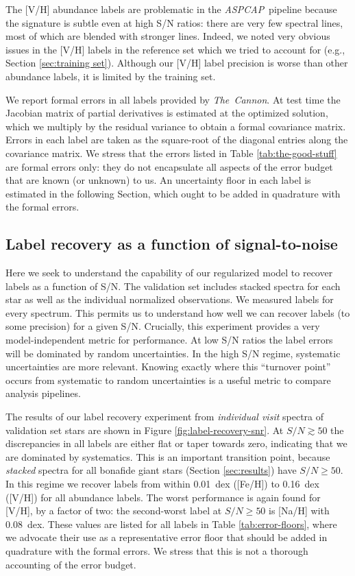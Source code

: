\documentclass[12pt,preprint]{aastex6}
\newcommand{\project}[1]{\textsl{#1}}
\newcommand{\TheCannon}{\project{The~Cannon}}
\newcommand{\acronym}[1]{{\small{#1}}}
\newcommand{\aspcap}{\project{\acronym{ASPCAP}}}
\begin{document}
The [V/H] abundance labels are problematic in the \aspcap\ pipeline 
because the signature is subtle even at high S/N ratios: there are very few
spectral lines, most of which are blended with stronger lines.  Indeed, we noted
very obvious issues in the [V/H] labels in the reference set which we tried to
account for (e.g., Section \ref{sec:training set}).  Although our [V/H]
label precision is worse than other abundance labels, it is limited by the
training set.


We report formal errors in all labels provided by \TheCannon. At test time the
Jacobian matrix of partial derivatives is estimated at the optimized solution,
which we multiply by the residual variance to obtain a formal covariance matrix.
Errors in each label are taken as the square-root of the diagonal entries along
the covariance matrix. We stress that the errors listed in Table \ref{tab:the-good-stuff}
are formal errors only: they do not encapsulate all aspects of the error budget
that are known (or unknown) to us. An uncertainty floor in each label is estimated
in the following Section, which ought to be added in quadrature with the formal
errors.

\subsection{Label recovery as a function of signal-to-noise}
\label{sec:label-recovery-snr}


Here we seek to understand the capability of our 
regularized model to recover labels as a function of S/N.  The validation set includes stacked spectra for each star
 as well as the individual normalized observations.  We measured labels for every spectrum.  This permits us
to understand how well we can recover labels (to some precision) for a given 
S/N.  Crucially, this experiment provides a very model-independent metric for
performance.  At low S/N ratios the label errors will be dominated by random
uncertainties.  In the high S/N regime, systematic uncertainties are more 
relevant.  Knowing exactly where this ``turnover point'' occurs from systematic
to random uncertainties is a useful metric to compare analysis pipelines.


The results of our label recovery experiment from \emph{individual visit} spectra of
validation set stars are shown in Figure \ref{fig:label-recovery-snr}.  
At $S/N \gtrsim 50$ the discrepancies in all
labels are either flat or taper towards zero, indicating that we are dominated
by systematics.  This is an important transition point, because \emph{stacked} spectra for all bonafide giant
stars (Section \ref{sec:results}) have $S/N \geq 50$.  In this regime we 
recover labels from within 0.01~dex ([Fe/H]) to 0.16~dex ([V/H]) for all 
abundance labels.  The worst performance is again found for [V/H], by a factor of
two: the second-worst label at $S/N \geq 50$ is [Na/H] with 0.08~dex.  These
values are listed for all labels in Table \ref{tab:error-floors}, where we advocate their use as a representative error floor that should be added in quadrature with the formal errors. We stress that this is not a thorough accounting of the error budget. 
\end{document}
